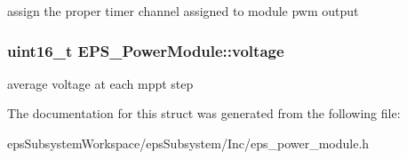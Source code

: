 assign the proper timer channel assigned to module pwm output \hypertarget{struct_e_p_s___power_module_a3a08d6acca23d042f74a0226b0eb9f60}{
\subsubsection[{voltage}]{\setlength{\rightskip}{0pt plus 5cm}uint16\-\_\-t E\-P\-S\-\_\-\-Power\-Module\-::voltage}}\label{struct_e_p_s___power_module_a3a08d6acca23d042f74a0226b0eb9f60}
average voltage at each mppt step 

The documentation for this struct was generated from the following file\-:\begin{DoxyCompactItemize}
\item 
eps\-Subsystem\-Workspace/eps\-Subsystem/\-Inc/eps\-\_\-power\-\_\-module.\-h\end{DoxyCompactItemize}
